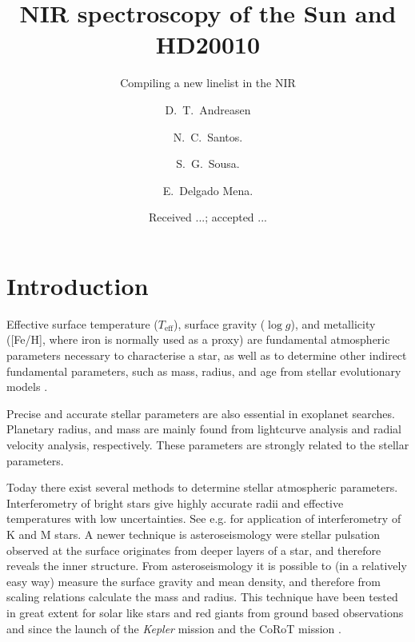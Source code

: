 \documentclass{aa}
\begin{document}
\title{NIR spectroscopy of the Sun and HD20010}
\subtitle{Compiling a new linelist in the NIR}

\subtitle{}

\author{D.~T.~Andreasen
    \and N.~C.~Santos.
    \and S.~G.~Sousa.
    \and E.~Delgado Mena.}









\date{Received ...; accepted ...}

\abstract{}{}{}{}



\maketitle



\section{Introduction}
\label{sec:introduction}

Effective surface temperature ($T_\mathrm{eff}$), surface gravity
($\log g$), and metallicity ([Fe/H], where iron is normally used
as a proxy) are fundamental atmospheric parameters necessary to
characterise a star, as well as to determine other indirect fundamental
parameters, such as mass, radius, and age from stellar evolutionary
models \citep{Girardi2000}.

Precise and accurate stellar parameters are also essential in exoplanet
searches. Planetary radius, and mass are mainly found from lightcurve
analysis and radial velocity analysis, respectively. These parameters
are strongly related to the stellar parameters.

Today there exist several methods to determine stellar atmospheric
parameters. Interferometry of bright stars give highly accurate
radii and effective temperatures with low uncertainties. See e.g.
\cite{Boyajian2012} for application of interferometry of K and M stars.
A newer technique is asteroseismology were stellar pulsation observed
at the surface originates from deeper layers of a star, and therefore
reveals the inner structure. From asteroseismology it is possible to (in
a relatively easy way) measure the surface gravity and mean density,
and therefore from scaling relations \citep{Kjeldsen1995} calculate
the mass and radius. This technique have been tested in great extent
for solar like stars and red giants from ground based observations and
since the launch of the \emph{Kepler} mission and the CoRoT mission
\citep{Michel2008,Huber2011,Huber2012}.
\end{document}
